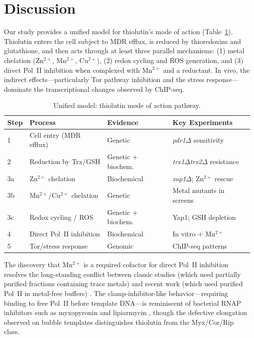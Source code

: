 \documentclass[11pt,a4paper]{article}
\begin{document}
\section{Discussion}

Our study provides a unified model for thiolutin's mode of action (Table~\ref{tab:model}). Thiolutin enters the cell subject to MDR efflux, is reduced by thioredoxins and glutathione, and then acts through at least three parallel mechanisms: (1) metal chelation (Zn$^{2+}$, Mn$^{2+}$, Cu$^{2+}$), (2) redox cycling and ROS generation, and (3) direct Pol~II inhibition when complexed with Mn$^{2+}$ and a reductant. In vivo, the indirect effects---particularly Tor pathway inhibition and the stress response---dominate the transcriptional changes observed by ChIP-seq.

\begin{table}[htbp]
\centering
\caption{Unified model: thiolutin mode of action pathway.}
\label{tab:model}
\small
\begin{tabular}{llll}
\toprule
\textbf{Step} & \textbf{Process} & \textbf{Evidence} & \textbf{Key Experiments} \\
\midrule
1 & Cell entry (MDR efflux) & Genetic & \textit{pdr1}$\Delta$ sensitivity \\
2 & Reduction by Trx/GSH & Genetic + biochem. & \textit{trx1}$\Delta$\textit{trx2}$\Delta$ resistance \\
3a & Zn$^{2+}$ chelation & Biochemical & \textit{zap1}$\Delta$; Zn$^{2+}$ rescue \\
3b & Mn$^{2+}$/Cu$^{2+}$ chelation & Genetic & Metal mutants in screens \\
3c & Redox cycling / ROS & Genetic + biochem. & Yap1; GSH depletion \\
4 & Direct Pol~II inhibition & Biochemical & In vitro + Mn$^{2+}$ \\
5 & Tor/stress response & Genomic & ChIP-seq patterns \\
\bottomrule
\end{tabular}
\end{table}

The discovery that Mn$^{2+}$ is a required cofactor for direct Pol~II inhibition resolves the long-standing conflict between classic studies (which used partially purified fractions containing trace metals) and recent work (which used purified Pol~II in metal-free buffers) \citep{Tipper1973, Lauber2016}. The clamp-inhibitor-like behavior---requiring binding to free Pol~II before template DNA---is reminiscent of bacterial RNAP inhibitors such as myxopyronin and lipiarmycin \citep{Mukhopadhyay2008, Srivastava2011, Maffioli2017, Boyaci2018}, though the defective elongation observed on bubble templates distinguishes thiolutin from the Myx/Cor/Rip class.
\end{document}
